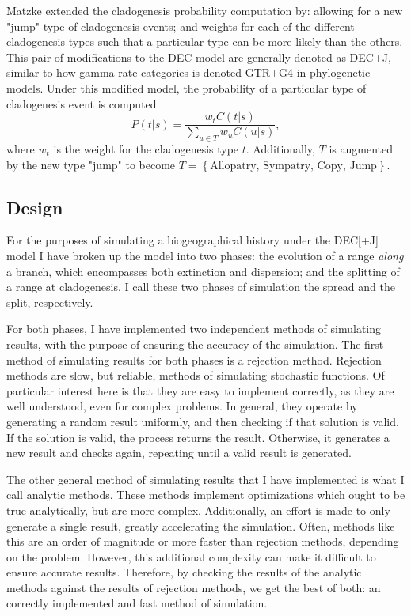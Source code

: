 \documentclass{article}
\begin{document}
Matzke\cite{ModelSelectionMatzke2014} extended the cladogenesis probability
computation by: allowing for a new "jump" type of cladogenesis events; and
weights for each of the different cladogenesis types such that a particular
type can be more likely than the others.
This pair of modifications to the DEC model are generally denoted as DEC+J,
similar to how gamma rate categories is denoted GTR+G4 in phylogenetic models.
Under this modified model, the probability of a particular type of cladogenesis
event is computed
\[
	P(t | s) = \frac{w_t C(t | s)}{\sum_{u \in T} w_u C(u |
		s)},
\]
where $w_t$ is the weight for the cladogenesis type $t$.
Additionally, $T$ is augmented by the new type "jump" to become \(T =
\left\{\text{Allopatry, Sympatry, Copy, Jump}\right\} \).

\subsection{Design}

For the purposes of simulating a biogeographical history under the DEC[+J]
model I have broken up the model into two phases: the evolution of a range
\textit{along} a branch, which encompasses both extinction and dispersion; and
the splitting of a range at cladogenesis.
I call these two phases of simulation the spread and the split, respectively.

For both phases, I have implemented two independent methods of simulating
results, with the purpose of ensuring the accuracy of the simulation.
The first method of simulating results for both phases is a rejection method.
Rejection methods are slow, but reliable, methods of simulating stochastic
functions.
Of particular interest here is that they are easy to implement correctly, as
they are well understood, even for complex problems.
In general, they operate by generating a random result uniformly, and then
checking if that solution is valid.
If the solution is valid, the process returns the result.
Otherwise, it generates a new result and checks again, repeating until a valid
result is generated.

The other general method of simulating results that I have implemented is what
I call analytic methods.
These methods implement optimizations which ought to be true analytically, but
are more complex.
Additionally, an effort is made to only generate a single result, greatly
accelerating the simulation.
Often, methods like this are an order of magnitude or more faster than
rejection methods, depending on the problem.
However, this additional complexity can make it difficult to ensure accurate
results.
Therefore, by checking the results of the analytic methods against the results
of rejection methods, we get the best of both: an correctly implemented and
fast method of simulation.
\end{document}

